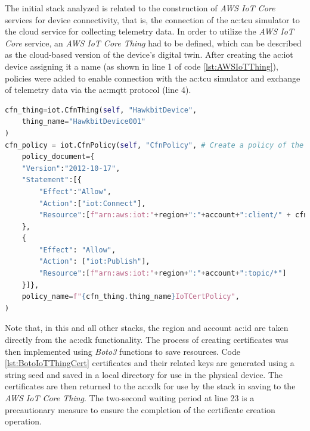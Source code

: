 The initial stack analyzed is related to the construction of \textit{AWS IoT Core} services for device connectivity, that is, the connection of the \gls{ac:tcu} simulator to the cloud service for collecting telemetry data. In order to utilize the \textit{AWS IoT Core} service, an \textit{AWS IoT Core Thing} had to be defined, which can be described as the cloud-based version of the device's digital twin. After creating the \gls{ac:iot} device assigning it a name (as shown in line 1 of code \ref{lst:AWSIoTThing}), policies were added to enable connection with the \gls{ac:tcu} simulator and exchange of telemetry data via the \gls{ac:mqtt} protocol (line 4).
\begin{lstlisting}[language=Python, caption={Code for the creation of \textit{AWS IoT Core Thing} and related policies}, label=lst:AWSIoTThing]
cfn_thing=iot.CfnThing(self, "HawkbitDevice",
    thing_name="HawkbitDevice001"
)
cfn_policy = iot.CfnPolicy(self, "CfnPolicy", # Create a policy of the certificate
    policy_document={
    "Version":"2012-10-17",
    "Statement":[{
        "Effect":"Allow",
        "Action":["iot:Connect"],
        "Resource":[f"arn:aws:iot:"+region+":"+account+":client/" + cfn_thing.thing_name]
    },
    {
        "Effect": "Allow",
        "Action": ["iot:Publish"],
        "Resource":[f"arn:aws:iot:"+region+":"+account+":topic/*"]
    }]},
    policy_name=f"{cfn_thing.thing_name}IoTCertPolicy",
)
\end{lstlisting}
Note that, in this and all other stacks, the region and account \gls{ac:id} are taken directly from the \gls{ac:cdk} functionality.
The process of creating certificates was then implemented using \textit{Boto3} functions to save resources. Code \ref{lst:BotoIoTThingCert} certificates and their related keys are generated using a string seed and saved in a local directory for use in the physical device. The certificates are then returned to the \gls{ac:cdk} for use by the stack in saving to the \textit{AWS IoT Core Thing}. The two-second waiting period at line 23 is a precautionary measure to ensure the completion of the certificate creation operation.
